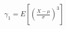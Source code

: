 \documentclass[preview]{standalone}
\begin{document}
\begin{align*}
\gamma_1 = E\left[ \left( \frac{X-\mu}{\sigma} \right)^3 \right]
\end{align*}
\end{document}
